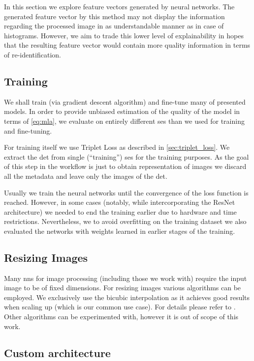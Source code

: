 In this section we explore feature vectors generated by neural networks.
The generated feature vector by this method may not display the information
regarding the processed image in as understandable manner as in case of
histograms. However, we aim to trade this lower level of explainability in
hopes that the resulting feature vector would contain more quality information
in terms of re-identification.

\subsection{Training}

We shall train (via gradient descent algorithm) and fine-tune many of presented
models. In order to provide unbiased estimation of the quality of the model in
terms of \autoref{eq:mla}, we evaluate on entirely different \gls{ses} than we
used for training and fine-tuning.

For training itself we use Triplet Loss as described in
\autoref{sec:triplet_loss}. We extract the \gls{det} from single
(``training'') \gls{ses} for the training purposes. As the goal of this step
in the workflow is just to obtain representation of images we discard all the
metadata and leave only the images of the \gls{det}.

Usually we train the neural networks until the convergence of the loss function
is reached. However, in some cases (notably, while intercorporating the ResNet
architecture) we needed to end the training earlier due to hardware and time
restrictions. Nevertheless, we to avoid overfitting on the training dataset
we also evaluated the networks with weights learned in earlier stages of 
the training.

\subsection{Resizing Images}

Many \glspl{nn} for image processing (including those we work with) require
the input image to be of fixed dimensions. For resizing images various
algorithms can be employed. We exclusively use the bicubic interpolation
as it achieves good results when scaling up (which is our common use case).
For details please refer to \cite{keys1981cubic}. Other algorithms can be
experimented with, however it is out of scope of this work.

\subsection{Custom architecture}

